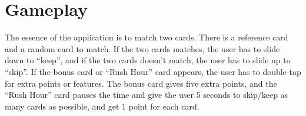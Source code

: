 \section{Gameplay}
The essence of the application is to match two cards. There is a reference card and a random card to match. If the two cards matches, the user has to slide down to “keep”, and if the two cards doesn’t match, the user has to slide up to “skip”. If the bonus card or “Rush Hour” card appears, the user has to double-tap for extra points or features. The bonus card gives five extra points, and the “Rush Hour” card pauses the time and give the user 5 seconds to skip/keep as many cards as possible, and get 1 point for each card.